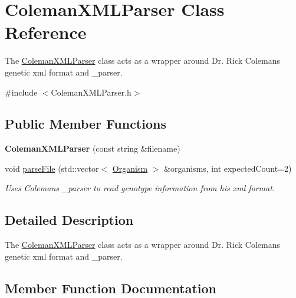 \hypertarget{class_coleman_x_m_l_parser}{}\section{Coleman\+X\+M\+L\+Parser Class Reference}
\label{class_coleman_x_m_l_parser}


The \hyperlink{class_coleman_x_m_l_parser}{Coleman\+X\+M\+L\+Parser} class acts as a wrapper around Dr. Rick Coleman\textquotesingle{}s genetic xml format and \+\_\+parser.  




{\ttfamily \#include $<$Coleman\+X\+M\+L\+Parser.\+h$>$}

\subsection*{Public Member Functions}
\begin{DoxyCompactItemize}
\item 
{\bfseries Coleman\+X\+M\+L\+Parser} (const string \&filename)\hypertarget{class_coleman_x_m_l_parser_a8eda751b3cb0b3f94add5a24fddacbc1}{}\label{class_coleman_x_m_l_parser_a8eda751b3cb0b3f94add5a24fddacbc1}

\item 
void \hyperlink{class_coleman_x_m_l_parser_a59121649e42ca29ca640ca0a3bf3e8a1}{parse\+File} (std\+::vector$<$ \hyperlink{class_organism}{Organism} $>$ \&organisms, int expected\+Count=2)
\begin{DoxyCompactList}\small\item\em Uses Coleman\textquotesingle{}s \+\_\+parser to read genotype information from his xml format. \end{DoxyCompactList}\end{DoxyCompactItemize}


\subsection{Detailed Description}
The \hyperlink{class_coleman_x_m_l_parser}{Coleman\+X\+M\+L\+Parser} class acts as a wrapper around Dr. Rick Coleman\textquotesingle{}s genetic xml format and \+\_\+parser. 

\subsection{Member Function Documentation}
